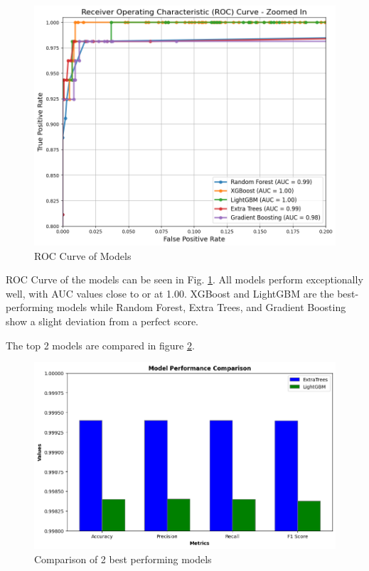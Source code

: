 \documentclass[runningheads]{llncs}
\begin{document}
\begin{figure}[ht]
    \centering
    \includegraphics[width=0.85\linewidth]{images/ROC_curve.png}
    \caption{ROC Curve of Models}
    \label{fig:roc_curve}
\end{figure}

ROC Curve of the models can be seen in Fig. \ref{fig:roc_curve}. All models perform exceptionally well, with AUC values close to or at 1.00. XGBoost and LightGBM are the best-performing models while Random Forest, Extra Trees, and Gradient Boosting show a slight deviation from a perfect score.

The top 2 models are compared in figure \ref{fig:top2comp}.
\begin{figure}[ht]
\centerline{\includegraphics[width=\linewidth]{images/top2compg.png}}
\caption{Comparison of 2 best performing models}
\label{fig:top2comp}
\end{figure}
\end{document}
